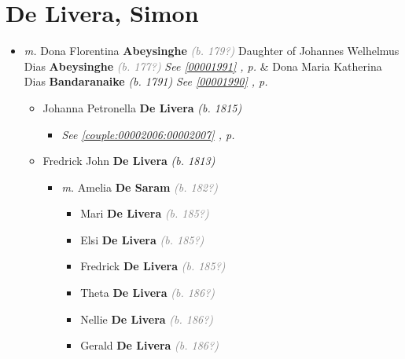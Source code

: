 \documentclass[10pt, openany]{book}
\begin{document}
\chapter{De Livera, Simon}
\label{00001193}
\textcolor{slmaroon}{\textit{}}
\begin{itemize}
\item{\textit{m.} Dona Florentina \textbf{Abeysinghe} \textcolor{gray}{\textit{(b. 179?)}} Daughter of  Johannes Welhelmus Dias \textbf{Abeysinghe} \textcolor{gray}{\textit{(b. 177?)}} \textcolor{slteal}{\textit{See  \autoref{00001991} \textit{, p. \pageref{00001991} }}}  \&  Dona Maria Katherina Dias \textbf{Bandaranaike} \textcolor{slorange}{\textit{(b. 1791)}} \textcolor{slteal}{\textit{See  \autoref{00001990} \textit{, p. \pageref{00001990} }}}   \label{couple:00001193:00001271} \begin{itemize}
\item{Johanna Petronella \textbf{De Livera} \textcolor{slorange}{\textit{(b. 1815)}}
\begin{itemize}
\item{\textcolor{slteal}{\textit{See  \autoref{couple:00002006:00002007} \textit{, p. \pageref{couple:00002006:00002007} }}}}
\end{itemize}
   }
\item{Fredrick John \textbf{De Livera} \textcolor{slorange}{\textit{(b. 1813)}}
\begin{itemize}
\item{\textit{m.} Amelia \textbf{De Saram} \textcolor{gray}{\textit{(b. 182?)}}   \label{couple:00001272:00001996} \begin{itemize}
\item{Mari \textbf{De Livera} \textcolor{gray}{\textit{(b. 185?)}}
  }
\item{Elsi \textbf{De Livera} \textcolor{gray}{\textit{(b. 185?)}}
  }
\item{Fredrick \textbf{De Livera} \textcolor{gray}{\textit{(b. 185?)}}
  }
\item{Theta \textbf{De Livera} \textcolor{gray}{\textit{(b. 186?)}}
  }
\item{Nellie \textbf{De Livera} \textcolor{gray}{\textit{(b. 186?)}}
  }
\item{Gerald \textbf{De Livera} \textcolor{gray}{\textit{(b. 186?)}}
  }

\end{itemize}}
\end{itemize}}
\end{itemize}}
\end{itemize}
\end{document}

